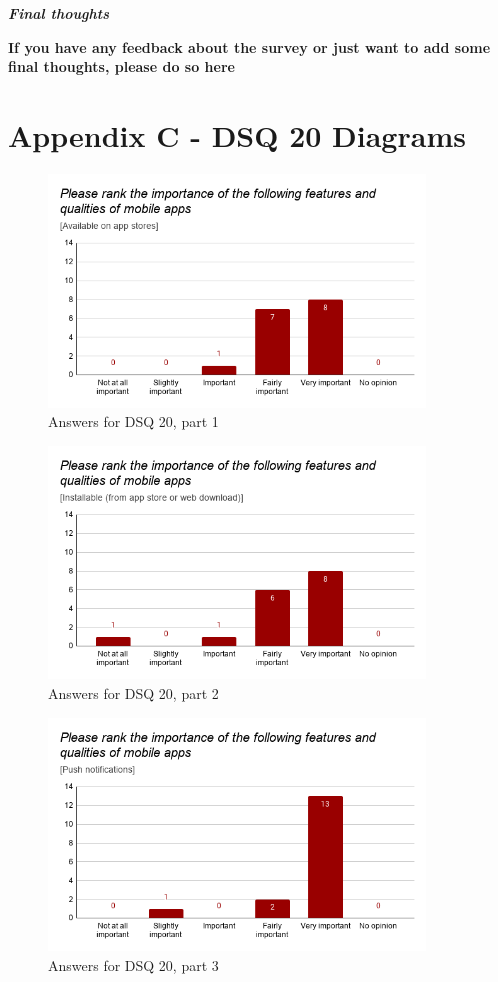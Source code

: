 \documentclass[a4paper,12pt]{article}
\begin{document}
\quad

\quad

\textbf{\textit{Final thoughts}}

\textbf{If you have any feedback about the survey or just want to add some final thoughts, please do so here}

\newpage
\section{Appendix C - DSQ 20 Diagrams}
\label{Appendix_devMultiDiagrams}

\begin{figure}[ht!]
    \centering
    \includegraphics[width=10cm]{img/Results/dsq20_1.png}
    \caption{Answers for DSQ 20, part 1}
    \label{fig:res_devq20_1}
\end{figure}

\begin{figure}[ht!]
    \centering
    \includegraphics[width=10cm]{img/Results/dsq20_2.png}
    \caption{Answers for DSQ 20, part 2}
    \label{fig:res_devq20_2}
\end{figure}

\begin{figure}[ht!]
    \centering
    \includegraphics[width=10cm]{img/Results/dsq20_3.png}
    \caption{Answers for DSQ 20, part 3}
    \label{fig:res_devq20_3}
\end{figure}
\newpage
\end{document}
